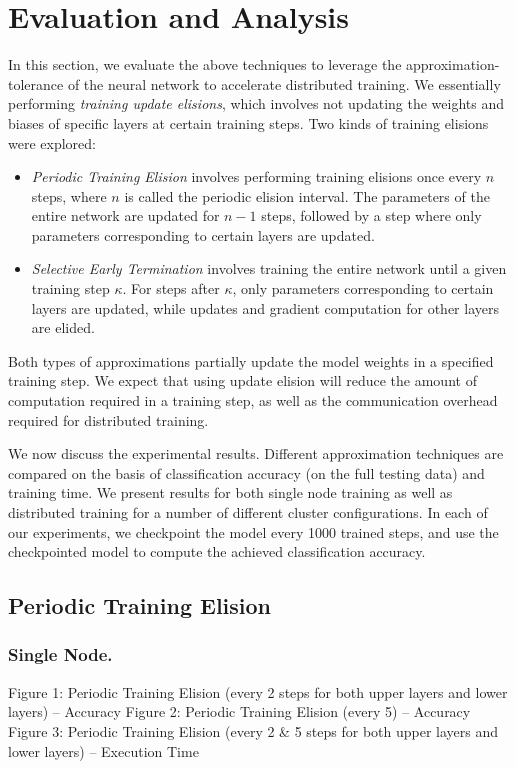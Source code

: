 \section{Evaluation and Analysis}
In this section, we evaluate the above techniques to leverage the approximation-tolerance of the neural network to accelerate distributed training. We essentially performing \textit{training update elisions}, which involves not updating the weights and biases of specific layers at certain training steps. Two kinds of training elisions were explored:
\begin{itemize}
	\item \textit{Periodic Training Elision} involves performing training elisions once every $n$ steps, where $n$ is called the periodic elision interval. The parameters of the entire network are updated for $n-1$ steps, followed by a step where only parameters corresponding to certain layers are updated.
	\item \textit{Selective Early Termination} involves training the entire network until a given training step $\kappa$. For steps after $\kappa$, only parameters corresponding to certain layers are updated, while updates and gradient computation for other layers are elided.

\end{itemize}

Both types of approximations partially update the model weights in a specified training step. We expect that using update elision will  reduce the amount of computation required in a training step, as well as the communication overhead required for distributed training. 

We now discuss the experimental results. Different approximation techniques are compared on the basis of classification accuracy (on the full testing data) and training time. We present results for both single node training as well as distributed training for a number of different cluster configurations. In each of our experiments, we checkpoint the model every 1000 trained steps, and use the checkpointed model to compute the achieved classification accuracy.

\subsection{Periodic Training Elision}
\subsubsection{Single Node.}
Figure 1: Periodic Training Elision (every 2 steps for both upper layers and lower layers) -- Accuracy
Figure 2: Periodic Training Elision (every 5) -- Accuracy
Figure 3: Periodic Training Elision (every 2 & 5 steps for both upper layers and lower layers) -- Execution Time
